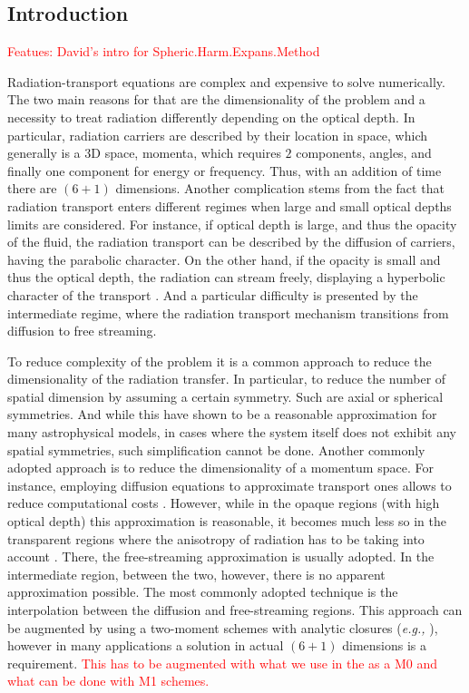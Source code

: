 \documentclass[11pt,a4paper,headinclude=true,DIV=14,BCOR=8mm,chapterprefix,listof=totoc,twoside,openright,abstracton]{scrbook}
\newcommand{\red}[1]{\textcolor{red}{#1}}
\begin{document}
\subsection{Introduction}
\red{Featues: David's intro for Spheric.Harm.Expans.Method}

Radiation-transport equations are complex and expensive to solve numerically. The two main reasons for that are the dimensionality of the problem and a necessity to treat radiation differently depending on the optical depth. In particular, radiation carriers are described by their location in space, which generally is a $3$D space, momenta, which requires $2$ components, angles, and finally one component for energy or frequency. Thus, with an addition of time there are $(6+1)$ dimensions. Another complication stems from the fact that radiation transport enters different regimes when large and small optical depths limits are considered. For instance, if optical depth is large, and thus the opacity of the fluid, the radiation transport can be described by the diffusion of carriers, having the parabolic character. On the other hand, if the opacity is small and thus the optical depth, the radiation can stream freely, displaying a hyperbolic character of the transport \cite{Mihalas:1984}. And a particular difficulty is presented by the intermediate regime, where the radiation transport mechanism transitions from diffusion to free streaming. 

To reduce complexity of the problem it is a common approach to reduce the dimensionality of the radiation transfer. In particular, to reduce the number of spatial dimension by assuming a certain symmetry. Such are axial or spherical symmetries. And while this have shown to be a reasonable approximation for many astrophysical models, in cases where the system itself does not exhibit any spatial symmetries, such simplification cannot be done. Another commonly adopted approach is to reduce the dimensionality of a momentum space. For instance, employing diffusion equations to approximate transport ones allows to reduce computational costs \cite{Pomraning:1973,Roe:1981}. However, while in the opaque regions (with high optical depth) this approximation is reasonable, it becomes much less so in the transparent regions where the anisotropy of radiation has to be taking into account \cite{Ott:2008jb}. There, the free-streaming approximation is usually adopted. In the intermediate region, between the two, however, there is no apparent approximation possible. The most commonly adopted technique is the interpolation between the diffusion and free-streaming regions. This approach can be augmented by using a two-moment schemes with analytic closures (\textit{e.g.,} \cite{Brunner:2002}), however in many applications a solution in actual $(6+1)$ dimensions is a requirement.
\red{This has to be augmented with what we use in the as a M0 and what can be done with M1 schemes.}
\end{document}
